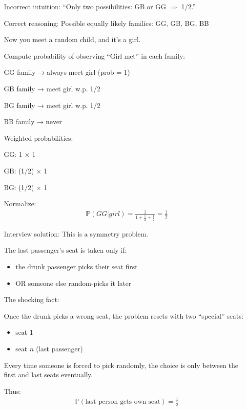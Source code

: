 \documentclass{report}
\begin{document}

\begin{sol}
    Incorrect intuition:
    “Only two possibilities: GB or GG $\Rightarrow$ 1/2.”

    Correct reasoning:
    Possible equally likely families:
    GG, GB, BG, BB

    Now you meet a random child, and it’s a girl.

    Compute probability of observing “Girl met” in each family:

    GG family → always meet girl (prob = 1)

    GB family → meet girl w.p. 1/2

    BG family → meet girl w.p. 1/2

    BB family → never

    Weighted probabilities:

    GG: 1 × 1

    GB: (1/2) × 1

    BG: (1/2) × 1

    Normalize:
    \begin{align*}
        \mathbb{P}(GG|girl)=\frac{1}{1+\frac{1}{2}+\frac{1}{2}}=\frac{1}{2}
    \end{align*}
    \end{sol}



\begin{sol}

Interview solution:
This is a symmetry problem.

The last passenger’s seat is taken only if:
\begin{itemize}
    \item the drunk passenger picks their seat first
    \item OR someone else random-picks it later
\end{itemize}

The shocking fact:

Once the drunk picks a wrong seat, the problem resets with two “special” seats:

\begin{itemize}
    \item seat 1
    \item seat $n$ (last passenger)
\end{itemize}

Every time someone is forced to pick randomly, the choice is only between the first and last seats eventually.

Thus:
\begin{align*}
    \mathbb{P}(\text{last person gets own seat})=\frac{1}{2}
\end{align*}

\end{sol}
\end{document}
